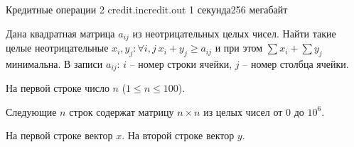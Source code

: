 
\begin{problem}{Кредитные операции 2}
{credit.in}{credit.out}
{1 секунда}{256 мегабайт}{}

Дана квадратная матрица $a_{ij}$ из неотрицательных целых чисел.
Найти такие целые неотрицательные $x_i, y_j \colon \forall i, j \ x_i + y_j \ge a_{ij}$ и при этом $\sum x_i + \sum y_j$ минимальна.
В записи $a_{ij}$: $i$ -- номер строки ячейки, $j$ -- номер столбца ячейки.

\InputFile

На первой строке число $n$ ($1 \le n \le 100$).

Следующие $n$ строк содержат матрицу $n \times n$ из целых чисел от $0$ до $10^6$.

\OutputFile

На первой строке вектор $x$. На второй строке вектор $y$.

\Examples

\begin{example}
%
\end{example}

\end{problem}
